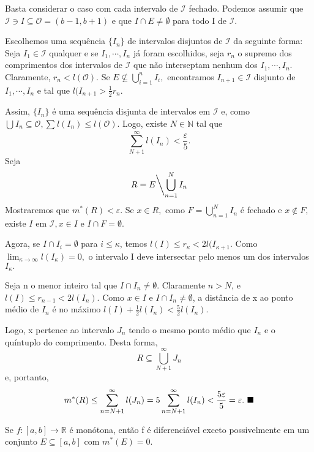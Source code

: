 \documentclass[Analysis/analysis_notes.tex]{subfiles}
\begin{document}
\begin{proof*}
	Basta considerar o caso com cada intervalo de \(\mathcal{I}\) fechado. Podemos assumir que
	\(\mathcal{I}\ni I \subseteq{\mathcal{O}=(b-1, b+1)}\) e que \(I\cap E \neq\emptyset\) para todo I
	de \(\mathcal{I}\).

	Escolhemos uma sequência \(\{I_{n}\}\) de intervalos disjuntos de \(\mathcal{I}\) da
	seguinte forma: Seja \(I_{1}\in \mathcal{I}\) qualquer e se \(I_{1}, \cdots, I_{n}\) já foram
	escolhidos, seja \(r_{n}\) o supremo dos comprimentos dos intervalos de \(\mathcal{I}\) que não interseptam
	nenhum dos \(I_{1}, \cdots, I_{n}\). Claramente, \(r_{n} <  l(\mathcal{O}).\) Se
	\(E\not\subseteq{\bigcup_{i=1}^{n}{I_{i}}},\) encontramos \(I_{n+1}\in \mathcal{I}\)
	disjunto de \(I_{1}, \cdots, I_{n}\) e tal que \(l(I_{n+1} > \frac{1}{2}r_{n}\).

	Assim, \(\{I_{n}\}\) é uma sequência disjunta de intervalos em \(\mathcal{I}\) e, como
	\(\bigcup_{}^{}{I_{n}\subseteq{\mathcal{O}}}, \sum\limits_{}^{}l(I_{n})\leq l(\mathcal{O}).\) Logo,
	existe \(N\in \mathbb{N}\) tal que
	\[
		\sum\limits_{N+1}^{\infty} l(I_{n}) < \frac{\varepsilon }{5}.
	\]
	Seja
	\[
		R = E\biggl\backslash\bigcup_{n=1}^{N}{I_{n}}\biggr.
	\]
	Mostraremos que \(m^{*}(R) < \varepsilon .\) Se \(x\in R,\) como \(F = \bigcup_{n=1}^{N}{I_{n}}\) é
	fechado e \(x\not\in F,\) existe \(I\) em \(\mathcal{I}, x\in I\) e \(I\cap F=\emptyset.\)

	Agora, se \(I\cap I_{i} = \emptyset\) para \(i\leq \kappa \), temos \(l(I)\leq r_{\kappa } < 2l(I_{\kappa +1}.\)
	Como \(\lim_{\kappa \to \infty}l(I_{\kappa }) = 0,\) o intervalo I deve intersectar
	pelo menos um dos intervalos \(I_{\kappa }.\)

	Seja n o menor inteiro tal que \(I\cap I_{n} \neq\emptyset\). Claramente \(n > N\), e
	\(l(I)\leq r_{n-1} < 2l(I_{n}).\) Como \(x\in I\) e \(I\cap I_{n} \neq\emptyset\), a distância de
	x ao ponto médio de \(I_{n}\) é no máximo \(l(I) + \frac{1}{2}l(I_{n}) < \frac{5}{2} l(I_{n}).\)

	Logo, x pertence ao intervalo \(J_{n}\) tendo o mesmo ponto médio que \(I_{n}\) e
	o quíntuplo do comprimento. Desta forma,
	\[
		R\subseteq{\bigcup_{N+1}^{\infty}{J_{n}}}
	\]
	e, portanto,
	\[
		m^{*}(R)\leq \sum\limits_{n=N+1}^{\infty}l(J_{n}) = 5\sum\limits_{n=N+1}^{\infty}l(I_{n}) < \frac{5\varepsilon }{5} = \varepsilon .\text{ $\blacksquare$}
	\]
\end{proof*}
\begin{lemma*}
	Se \(f:[a, b]\rightarrow \mathbb{R}\) é monótona, então f é diferenciável exceto
	possivelmente em um conjunto \(E\subseteq{[a, b]}\) com \(m^{*}(E) = 0\).
\end{lemma*}
\end{document}
